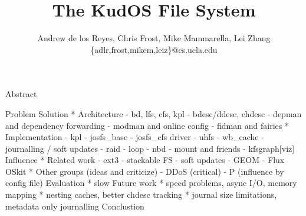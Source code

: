 \documentclass[11pt]{article}
\title{The KudOS File System}
\author{Andrew de los Reyes, Chris Frost, Mike Mammarella, Lei Zhang\\ \{adlr,frost,mikem,leiz\}@cs.ucla.edu}
\begin{document}
\maketitle



Abstract

Problem
Solution
* Architecture
 - bd, lfs, cfs, kpl
 - bdesc/ddesc, chdesc
 - depman and dependency forwarding
 - modman and online config
 - fidman and fairies
* Implementation
 - kpl
 - josfs\_base
 - josfs\_cfs driver
 - uhfs
 - wb\_cache
 - journalling / soft updates
 - raid
 - loop
 - nbd
 - mount and friends
 - kfsgraph[viz]
Influence
* Related work
 - ext3
 - stackable FS
 - soft updates
 - GEOM
 - Flux OSkit
* Other groups (ideas and criticize)
 - DDoS (critical)
 - P (influence by config file)
Evaluation
* slow
Future work
* speed problems, async I/O, memory mapping
* nesting caches, better chdesc tracking
* journal size limitations, metadata only journalling
Conclustion




\end{document}
